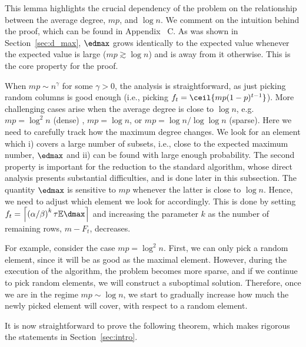 \noindent
This lemma highlights the crucial dependency of the problem 
on the relationship between the average degree, \(mp\), and \(\log n\). We comment on the intuition behind the proof, which can be found in Appendix ~C. As was shown in Section~\ref{sec:d_max}, \(\edmax\) grows identically to the expected value whenever the expected value is large (\(mp \gtrsim \log n\)) and is away from it otherwise. This is the core property for the proof. 

\noindent
When \(mp \sim n^{\gamma}\) for some \(\gamma > 0\), the analysis is straightforward, as just picking random columns is good enough (i.e., picking \(f_t = \ceil{mp(1 - p)^{t - 1}}\)). More challenging cases arise when the average degree is close to \(\log n\), e.g. \(mp = \log^2 n\) (dense) , \(mp = \log n\), or \(mp = \log n / \log \log n\) (sparse). Here we need to carefully track how the maximum degree changes. We look for an element which i) covers a large number of subsets, i.e., close to the expected maximum number, \(\edmax\) and ii) can be found with large enough probability. The second property is important for the reduction to the standard \greedy algorithm, whose direct analysis presents substantial difficulties, and is done later in this subsection. The quantity $\edmax$ is sensitive to $mp$ whenever the latter is close to $\log{n}$. Hence, we need to adjust which element we look for accordingly. This is done by setting \(f_t = \left\lceil\left(\alpha / \beta \right)^k \tau\mathbb{E}\dmax\right\rceil\) and increasing the parameter \(k\) as the number of remaining rows, \(m - F_t\), decreases. 

\noindent
For example, consider the case \(mp = \log^2 n\). First, we can only pick a random element, since it will be as good as the maximal element. However, during the execution of the algorithm, the problem becomes more sparse, and if we continue to pick random elements, we will construct a suboptimal solution. Therefore, once we are in the regime \(mp \sim \log n\), we start to gradually increase how much the newly picked element will cover, with respect to a random element.

\noindent
It is now straightforward to prove the following theorem, which makes rigorous the statements in Section~\ref{sec:intro}.


